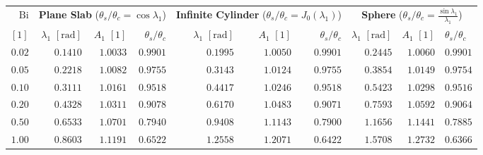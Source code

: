 \par\smallskip\noindent
\begin{minipage}{\linewidth}
\label{tab:13:heisler-erf}
\footnotesize
\setlength{\tabcolsep}{4pt}
\renewcommand{\arraystretch}{1.12}
\begin{tabularx}{\linewidth}{@{}r r r r r r r r r X@{}}
\toprule
$\mathrm{Bi}$ & \multicolumn{3}{c}{\textbf{Plane Slab} ($\theta_s/\theta_c = \cos\lambda_1$)} & \multicolumn{3}{c}{\textbf{Infinite Cylinder} ($\theta_s/\theta_c = J_0(\lambda_1)$)} & \multicolumn{3}{c}{\textbf{Sphere} ($\theta_s/\theta_c = \frac{\sin\lambda_1}{\lambda_1}$)} \\
$[1]$ & $\lambda_1$ $[\si{\radian}]$ & $A_1$ $[1]$ & $\theta_s/\theta_c$ & $\lambda_1$ $[\si{\radian}]$ & $A_1$ $[1]$ & $\theta_s/\theta_c$ & $\lambda_1$ $[\si{\radian}]$ & $A_1$ $[1]$ & $\theta_s/\theta_c$ \\
\midrule
$0.02$ & $0.1410$ & $1.0033$ & $0.9901$ & $0.1995$ & $1.0050$ & $0.9901$ & $0.2445$ & $1.0060$ & $0.9901$ \\
$0.05$ & $0.2218$ & $1.0082$ & $0.9755$ & $0.3143$ & $1.0124$ & $0.9755$ & $0.3854$ & $1.0149$ & $0.9754$ \\
$0.10$ & $0.3111$ & $1.0161$ & $0.9518$ & $0.4417$ & $1.0246$ & $0.9518$ & $0.5423$ & $1.0298$ & $0.9516$ \\
$0.20$ & $0.4328$ & $1.0311$ & $0.9078$ & $0.6170$ & $1.0483$ & $0.9071$ & $0.7593$ & $1.0592$ & $0.9064$ \\
$0.50$ & $0.6533$ & $1.0701$ & $0.7940$ & $0.9408$ & $1.1143$ & $0.7900$ & $1.1656$ & $1.1441$ & $0.7885$ \\
$1.00$ & $0.8603$ & $1.1191$ & $0.6522$ & $1.2558$ & $1.2071$ & $0.6422$ & $1.5708$ & $1.2732$ & $0.6366$ \\

\end{tabularx}
\end{minipage}
